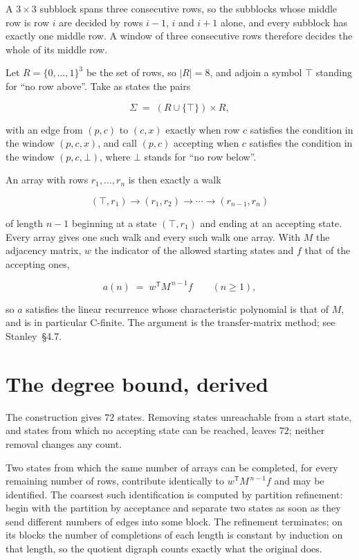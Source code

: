 \documentclass[11pt]{article}
\theoremstyle{definition}
\begin{document}
A $3 \times 3$ subblock spans three consecutive rows, so the subblocks whose middle row is row $i$ are decided by rows $i-1$, $i$ and $i+1$ alone, and every subblock has exactly one middle row. A window of three consecutive rows therefore decides the whole of its middle row.

Let $R = \{0,\dots,1\}^{3}$ be the set of rows, so $|R| = 8$, and adjoin a symbol $\top$ standing for ``no row above''. Take as states the pairs

\[\Sigma \;=\; (R \cup \{\top\}) \times R,\]

with an edge from $(p,c)$ to $(c,x)$ exactly when row $c$ satisfies the condition in the window $(p,c,x)$, and call $(p,c)$ accepting when $c$ satisfies the condition in the window $(p,c,\bot)$, where $\bot$ stands for ``no row below''.

An array with rows $r_1,\dots,r_n$ is then exactly a walk

\[(\top,r_1) \to (r_1,r_2) \to \cdots \to (r_{n-1},r_n)\]

of length $n-1$ beginning at a state $(\top,r_1)$ and ending at an accepting state. Every array gives one such walk and every such walk one array. With $M$ the adjacency matrix, $w$ the indicator of the allowed starting states and $f$ that of the accepting ones,

\[a(n) \;=\; w^{\mathsf T} M^{\,n-1} f \qquad (n \ge 1),\]

so $a$ satisfies the linear recurrence whose characteristic polynomial is that of $M$, and is in particular C-finite. The argument is the transfer-matrix method; see Stanley~\S4.7.

\section{The degree bound, derived}

The construction gives $72$ states. Removing states unreachable from a start state, and states from which no accepting state can be reached, leaves $72$; neither removal changes any count.

Two states from which the same number of arrays can be completed, for every remaining number of rows, contribute identically to $w^{\mathsf T}M^{\,n-1}f$ and may be identified. The coarsest such identification is computed by partition refinement: begin with the partition by acceptance and separate two states as soon as they send different numbers of edges into some block. The refinement terminates; on its blocks the number of completions of each length is constant by induction on that length, so the quotient digraph counts exactly what the original does.
\end{document}
